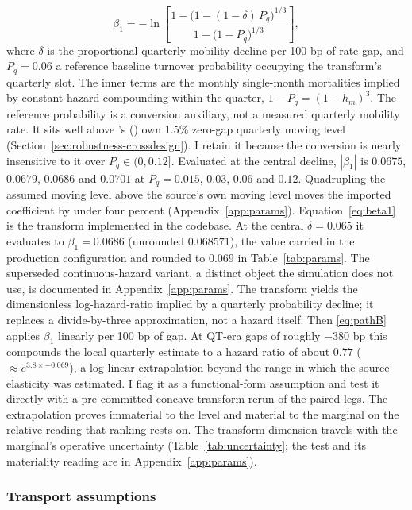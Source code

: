 \documentclass[12pt]{article}
\newcommand{\citepos}[1]{\citeauthor{#1}'s (\citeyear{#1})}
\begin{document}
\begin{equation}\label{eq:beta1}
\beta_1 = -\ln\!\left[\frac{1-\big(1-(1-\delta)\,P_q\big)^{1/3}}{1-\big(1-P_q\big)^{1/3}}\right],
\end{equation}
where $\delta$ is the proportional quarterly mobility decline per 100 bp of rate gap, and $P_q = 0.06$ a reference baseline turnover probability occupying the transform's quarterly slot. The inner terms are the monthly single-month mortalities implied by constant-hazard compounding within the quarter, $1 - P_q = (1 - h_m)^3$. The reference probability is a conversion auxiliary, not a measured quarterly mobility rate. It sits well above \citepos{liebersohn2024} own 1.5\% zero-gap quarterly moving level (Section~\ref{sec:robustness-crossdesign}). I retain it because the conversion is nearly insensitive to it over $P_q \in (0, 0.12]$. Evaluated at the central decline, $|\beta_1|$ is $0.0675$, $0.0679$, $0.0686$ and $0.0701$ at $P_q = 0.015$, $0.03$, $0.06$ and $0.12$. Quadrupling the assumed moving level above the source's own moving level moves the imported coefficient by under four percent (Appendix~\ref{app:params}). Equation~\eqref{eq:beta1} is the transform implemented in the codebase. At the central $\delta = 0.065$ it evaluates to $\beta_1 = 0.0686$ (unrounded $0.068571$), the value carried in the production configuration and rounded to $0.069$ in Table~\ref{tab:params}. The superseded continuous-hazard variant, a distinct object the simulation does not use, is documented in Appendix~\ref{app:params}. The transform yields the dimensionless log-hazard-ratio implied by a quarterly probability decline; it replaces a divide-by-three approximation, not a hazard itself. Then \eqref{eq:pathB} applies $\beta_1$ linearly per 100 bp of gap. At QT-era gaps of roughly $-380$ bp this compounds the local quarterly estimate to a hazard ratio of about $0.77$ ($\approx e^{3.8 \times -0.069}$), a log-linear extrapolation beyond the range in which the source elasticity was estimated. I flag it as a functional-form assumption and test it directly with a pre-committed concave-transform rerun of the paired legs. The extrapolation proves immaterial to the level and material to the marginal on the relative reading that ranking rests on. The transform dimension travels with the marginal's operative uncertainty (Table~\ref{tab:uncertainty}; the test and its materiality reading are in Appendix~\ref{app:params}).

\subsubsection{Transport assumptions}
\end{document}
